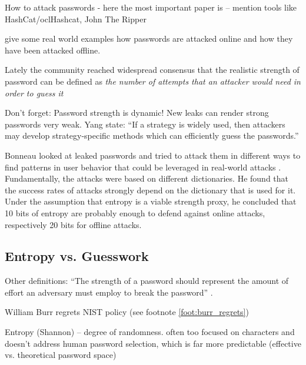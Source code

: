 How to attack passwords
- here the most important paper is \cite{Ur2015MeasuringRealWorldAccuracies} -- mention tools like HashCat/oclHashcat, John The Ripper 

give some real world examples how passwords are attacked online and how they have been attacked offline. 


Lately the community reached widespread consensus that the realistic strength of password can be defined as \textit{the number of attempts that an attacker would need in order to guess it} \cite{Dellamico2015MonteCarlo}

 

Don't forget: Password strength is dynamic! New leaks can render strong passwords very weak. Yang \etal state: ``If a strategy is widely used, then attackers may develop strategy-specific methods which can efficiently guess the passwords.''

Bonneau looked at leaked passwords and tried to attack them in different ways to find patterns in user behavior that could be leveraged in real-world attacks \cite{Bonneau2012ScienceOfGuessing}. Fundamentally, the attacks were based on different dictionaries. He found that the success rates of attacks strongly depend on the dictionary that is used for it. Under the assumption that entropy is a viable strength proxy, he concluded that 10 bits of entropy are probably enough to defend against online attacks, respectively 20 bits for offline attacks. 

\cite{Peisert2013PriciplesAuthentication,Bonneau2012ScienceOfGuessing,Scott1995GDMS,Dellamico2015MonteCarlo,Ur2015MeasuringRealWorldAccuracies,Egelman2015SeBIS,Conklin2004PWAuthenticationSystemPerspective,Schmidt2013Pitfalls,Kelley2012GuessAgain,Mazurek2013Measuring,Weir2010MetricsPolicies}

	\subsection{Entropy vs. Guesswork}
	
	Other definitions: ``The strength of a password should represent the amount of effort an adversary must employ to break the password'' \cite{Carnavalet2014AnalyzingPWStrengthMeters}.
	
	William Burr regrets NIST policy (see footnote \ref{foot:burr_regrets})	
	
	Entropy (Shannon) -- degree of randomness. often too focused on characters and doesn't address human password selection, which is far more predictable 
	(effective vs. theoretical password space)
	
